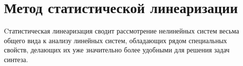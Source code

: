 \section{Метод статистической линеаризации}
Cтатистическая линеаризация сводит рассмотрение нелинейных систем весьма общего вида к анализу линейных систем, обладающих рядом специальных свойств, делающих их уже значительно более удобными для решения задач синтеза.
\clearpage